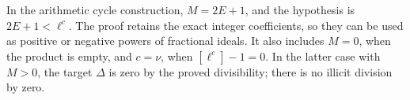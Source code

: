 In the arithmetic cycle construction,
\(M=2E+1\), and the hypothesis is
\(2E+1<\ell^c\).
The proof retains the exact integer coefficients, so
they can be used as positive or negative powers of
fractional ideals.
It also includes \(M=0\), when the product is empty,
and \(c=\nu\), when \([\ell^c]-1=0\).
In the latter case with \(M>0\), the target
\(\Delta\) is zero by the proved divisibility;
there is no illicit division by zero.


